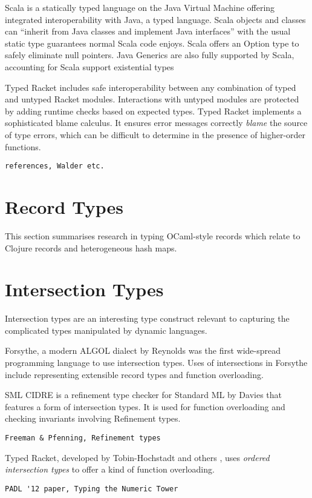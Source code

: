 Scala is a statically typed language on the Java Virtual Machine offering integrated interoperability with Java, a typed language.
Scala objects and classes can ``inherit from Java classes and implement Java interfaces''\cite{OCD+}
with the usual static type guarantees normal Scala code enjoys.
Scala offers an Option type to safely eliminate null pointers.
Java Generics are also fully supported by Scala, accounting for Scala support existential types

Typed Racket includes safe interoperability between any combination of typed and untyped 
Racket modules\cite{Tob10}\cite{TF08}. 
Interactions with untyped modules are protected by adding runtime checks based on expected types.
Typed Racket implements a sophisticated blame calculus. It ensures 
error messages correctly \emph{blame} the source of type errors,
which can be difficult to determine in the presence of higher-order functions. 
\begin{verbatim}references, Walder etc.\end{verbatim}

\section{Record Types}

This section summarises research in typing OCaml-style records
which relate to Clojure records and heterogeneous hash maps.

\section{Intersection Types}

Intersection types are an interesting type construct relevant to capturing the complicated
types manipulated by dynamic languages.

Forsythe, a modern ALGOL dialect by Reynolds\cite{Rey96} was the first wide-spread 
programming language to use intersection types.
Uses of intersections in Forsythe include representing extensible record types
and function overloading.

SML CIDRE is a refinement type checker for Standard ML by Davies \cite{Dav05}
that features a form of intersection types. It is used for function overloading
and checking invariants involving Refinement types.
\begin{verbatim}
Freeman & Pfenning, Refinement types
\end{verbatim}

Typed Racket, developed by Tobin-Hochstadt and others \cite{Tob10}, uses \emph{ordered intersection types} 
to offer a kind of function overloading.
\begin{verbatim}PADL '12 paper, Typing the Numeric Tower\end{verbatim}

